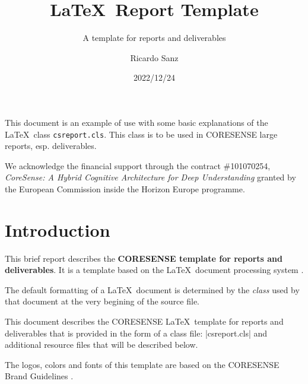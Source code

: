 \documentclass{csreport}
\begin{document}

\title{\LaTeX\ Report Template}
\subtitle{A template for reports and deliverables}
\author{Ricardo Sanz}
\date{2022/12/24}

\maketitle

\executivesummary

This document is an example of use with some basic explanations of the \LaTeX\ class \texttt{csreport.cls}. This class is to be used in CORESENSE large reports, esp. deliverables.

We acknowledge the financial support through the contract \#101070254, \emph{CoreSense: A Hybrid Cognitive Architecture for Deep Understanding} granted by the European Commission inside the Horizon Europe programme.
 

\documentversions
{}

\tableofcontents





\chapter{Introduction}

This brief report describes the \textbf{CORESENSE template for reports and deliverables}. It is a template based on the \LaTeX\ document processing system \cite{Lamport-1986}.

The default formatting of a \LaTeX\ document is determined by the \emph{class} used by that document at the very begining of the source file. 

This document describes the CORESENSE \LaTeX\ template for reports and deliverables that is provided in the form of a class file: \code|csreport.cls| and additional resource files that will be described below.

The logos, colors and fonts of this template are based on the CORESENSE Brand Guidelines \cite{CORESENSE-017}.
\end{document}
